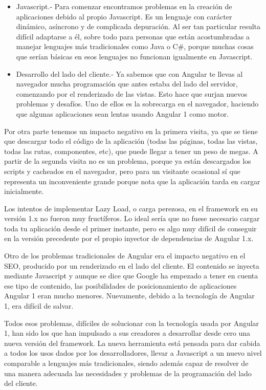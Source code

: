 \documentclass[12pt,twoside]{book}
\begin{document}
\begin{itemize}
\item Javascript.-  Para comenzar encontramos problemas en la creación de aplicaciones debido al propio Javascript. Es un lenguaje con carácter dinámico, asíncrono y de complicada depuración. Al ser tan particular resulta difícil adaptarse a él, sobre todo para personas que están acostumbradas a manejar lenguajes más tradicionales como Java o C\#, porque muchas cosas que serían básicas en esos lenguajes no funcionan igualmente en Javascript.

\item Desarrollo del lado del cliente.- Ya sabemos que con Angular te llevas al navegador mucha programación que antes estaba del lado del servidor, comenzando por el renderizado de las vistas. Esto hace que surjan nuevos problemas y desafíos. Uno de ellos es la sobrecarga en el navegador, haciendo que algunas aplicaciones sean lentas usando Angular 1 como motor.
\end{itemize}

Por otra parte tenemos un impacto negativo en la primera visita, ya que se tiene que descargar todo el código de la aplicación (todas las páginas, todas las vistas, todas las rutas, componentes, etc), que puede llegar a tener un peso de megas. A partir de la segunda visita no es un problema, porque ya están descargados los scripts y cacheados en el navegador, pero para un visitante ocasional sí que representa un inconveniente grande porque nota que la aplicación tarda en cargar inicialmente.

Los intentos de implementar Lazy Load, o carga perezosa, en el framework en su versión 1.x no fueron muy fructíferos. Lo ideal sería que no fuese necesario cargar toda tu aplicación desde el primer instante, pero es algo muy difícil de conseguir en la versión precedente por el propio inyector de dependencias de Angular 1.x.

Otro de los problemas tradicionales de Angular era el impacto negativo en el SEO, producido por un renderizado en el lado del cliente. El contenido se inyecta mediante Javascript y aunque se dice que Google ha empezado a tener en cuenta ese tipo de contenido, las posibilidades de posicionamiento de aplicaciones Angular 1 eran mucho menores. Nuevamente, debido a la tecnología de Angular 1, era difícil de salvar.


Todos esos problemas, difíciles de solucionar con la tecnología usada por Angular 1, han sido los que han impulsado a sus creadores a desarrollar desde cero una nueva versión del framework. La nueva herramienta está pensada para dar cabida a todos los usos dados por los desarrolladores, llevar a Javascript a un nuevo nivel comparable a lenguajes más tradicionales, siendo además capaz de resolver de una manera adecuada las necesidades y problemas de la programación del lado del cliente.
\end{document}
